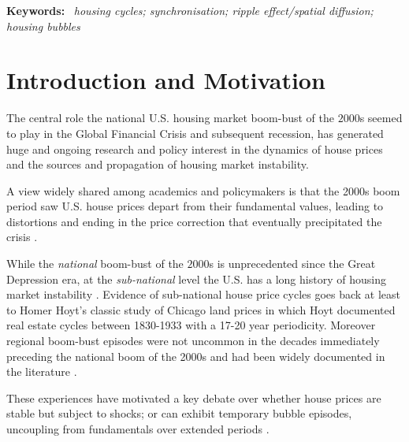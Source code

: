 \documentclass[11pt]{article}
\newenvironment{keywords}{\par\small\noindent\textbf{Keywords:}\ }{\par\normalsize}
\begin{document}
\begin{abstract}
\end{abstract}

\begin{keywords}
\textit{housing cycles; synchronisation; ripple effect/spatial diffusion; housing bubbles}
\end{keywords}

\section{Introduction and Motivation}

The central role the national U.S. housing market boom-bust of the $2000$s seemed to play in the Global Financial Crisis and subsequent recession, has generated huge and ongoing research and policy interest in the dynamics of house prices and the sources and propagation of housing market instability. 

A view widely shared among academics and policymakers is that the 2000s boom period saw U.S. house prices depart from their fundamental values, leading to distortions and ending in the price correction that eventually precipitated the crisis \citep{Bernanke2010}. 

While the \textit{national} boom-bust of the $2000$s is unprecedented since the Great Depression era, at the \textit{sub-national} level the U.S. has a long history of housing market instability \citep{Glaeser2013}. Evidence of sub-national house price cycles goes back at least to Homer Hoyt’s classic study of Chicago land prices \citep{Hoyt1933} in which Hoyt documented real estate cycles between 1830-1933 with a 17-20 year periodicity. Moreover regional boom-bust episodes were not uncommon in the decades immediately preceding the national boom of the 2000s and had been widely documented in the literature \citep{Case1992,Case1993,Case1988,Riddel1999,Wheelock2006,Shiller1990}.


These experiences have motivated a key debate over whether house prices are %
stable but subject to shocks; or can exhibit temporary bubble episodes, uncoupling from fundamentals over extended periods \citep{Shiller1990, Mikhed2009, Clark2011, Abraham1996}.  
\end{document}
